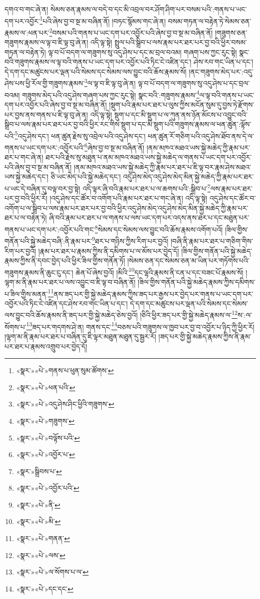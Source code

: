 དགའ་བ་གང་ཞེ་ན། སེམས་ཅན་རྣམས་ལ་བདེ་བ་དང་མི་འབྲལ་བར་ཤོག་ཤིག་པར་བསམ་པའི་:གནས་པ་ཡང་དག་པར་འབྱོར་\footnote{«སྣར་»«པེ་»གནས་པ་ཕུན་སུམ་ཚོགས་}པའི་ཞེས་བྱ་བ་སྔ་མ་བཞིན་ནོ། །བཏང་སྙོམས་གང་ཞེ་ན། བསམ་གཏན་ལ་བརྟེན་ཏེ་སེམས་ཅན་རྣམས་ལ་:ཕན་པར་\footnote{«སྣར་»«པེ་»ཕན་པའི་}བསམ་པའི་གནས་པ་ཡང་དག་པར་འབྱོར་པའི་ཞེས་བྱ་བ་སྔ་མ་བཞིན་ནོ། །གཟུགས་ཅན་གཟུགས་རྣམས་ལ་ལྟ་བ་ཇི་ལྟ་བུ་ཞེ་ན། འདི་ལྟ་སྟེ། སྤྲུལ་པའི་སྒྲིབ་པ་ལས་རྣམ་པར་ཐར་པར་བྱ་བའི་ཕྱིར་བསམ་གཏན་ལ་བརྟེན་ཏེ། ལྟ་བ་པོ་བདག་ལ་གཟུགས་སུ་འདུ་ཤེས་པ་དང་མ་བྲལ་བའམ། གཞག་པས་ཀྱང་རུང་སྟེ། སྣང་བའི་གཟུགས་རྣམས་ལ་ལྟ་བའི་གནས་པ་ཡང་དག་པར་འབྱོར་པའི་ཏིང་ངེ་འཛིན་དང་། ཤེས་རབ་གང་ཡིན་པ་དང་། དེ་དག་དང་མཚུངས་པར་ལྡན་པའི་སེམས་དང་སེམས་ལས་བྱུང་བའི་ཆོས་རྣམས་སོ། །ནང་གཟུགས་མེད་པར་:འདུ་ཤེས་པས་ཕྱི་རོལ་གྱི་གཟུགས་རྣམས་\footnote{«སྣར་»«པེ་»འདུ་ཤེས་ཤིང་ཕྱིའི་གཟུགས་}ལ་ལྟ་བ་ཇི་ལྟ་བུ་ཞེ་ན། ལྟ་བ་པོ་བདག་ལ་གཟུགས་སུ་འདུ་ཤེས་པ་དང་བྲལ་བའམ། གཟུགས་མེད་པའི་འདུ་ཤེས་གཞག་པས་ཀྱང་རུང་སྟེ། སྣང་བའི་:གཟུགས་རྣམས་\footnote{«སྣར་»«པེ་»གཟུགས་}ལ་ལྟ་བའི་གནས་པ་ཡང་དག་པར་འབྱོར་པའི་ཞེས་བྱ་བ་སྔ་མ་བཞིན་ནོ། །སྡུག་པའི་རྣམ་པར་ཐར་པ་ལུས་ཀྱིས་མངོན་སུམ་དུ་བྱས་ཏེ་རྫོགས་པར་བྱས་ནས་གནས་པ་ཇི་ལྟ་བུ་ཞེ་ན། འདི་ལྟ་སྟེ། སྡུག་པ་དང་མི་སྡུག་པ་ལ་ཀུན་ནས་ཉོན་མོངས་པ་འབྱུང་བའི་སྒྲིབ་པ་ལས་རྣམ་པར་ཐར་པར་བྱ་བའི་ཕྱིར་རང་གིས་སྡུག་པ་དང་མི་སྡུག་པའི་གཟུགས་རྣམས་ལ་ཕན་ཚུན་:ལྟོས་པའི་\footnote{«སྣར་»«པེ་»བལྟོས་པའི་}འདུ་ཤེས་དང་། ཕན་ཚུན་རྗེས་སུ་འབྲེལ་པའི་འདུ་ཤེས་དང་། ཕན་ཚུན་རོ་གཅིག་པའི་འདུ་ཤེས་ཐོབ་ནས་དེ་ལ་གནས་པ་ཡང་དག་པར་:འབྱོར་པའི་\footnote{«སྣར་»«པེ་»འབྱོར་པ་}ཞེས་བྱ་བ་སྔ་མ་བཞིན་ནོ། །ནམ་མཁའ་མཐའ་ཡས་སྐྱེ་མཆེད་ཀྱི་རྣམ་པར་ཐར་པ་གང་ཞེ་ན། ཐར་པའི་རྗེས་སུ་མཐུན་པ་ནམ་མཁའ་མཐའ་ཡས་སྐྱེ་མཆེད་ལ་གནས་པ་ཡང་དག་པར་འབྱོར་པའི་ཞེས་བྱ་བ་སྔ་མ་བཞིན་ནོ། །ནམ་མཁའ་མཐའ་ཡས་སྐྱེ་མཆེད་ཀྱི་རྣམ་པར་ཐར་པ་ཇི་ལྟ་བར་རྣམ་ཤེས་མཐའ་ཡས་སྐྱེ་མཆེད་དང་། ཅི་ཡང་མེད་པའི་སྐྱེ་མཆེད་དང་། འདུ་ཤེས་མེད་འདུ་ཤེས་མེད་མིན་སྐྱེ་མཆེད་ཀྱི་རྣམ་པར་ཐར་པ་ཡང་དེ་བཞིན་དུ་བལྟ་བར་བྱ་སྟེ། འདི་ལྟར་ཞི་བའི་རྣམ་པར་ཐར་པ་ལ་ཆགས་པའི་:སྒྲིབ་པ་\footnote{«སྣར་»སྒྲིབས་པ་}ལས་རྣམ་པར་ཐར་པར་བྱ་བའི་ཕྱིར་རོ། །འདུ་ཤེས་དང་ཚོར་བ་འགོག་པའི་རྣམ་པར་ཐར་པ་གང་ཞེ་ན། འདི་ལྟ་སྟེ། འདུ་ཤེས་དང་ཚོར་བ་འགོག་པ་ལ་སྒྲིབ་པ་ལས་རྣམ་པར་ཐར་པར་བྱ་བའི་ཕྱིར་འདུ་ཤེས་མེད་འདུ་ཤེས་མེད་མིན་སྐྱེ་མཆེད་ཀྱི་རྣམ་པར་ཐར་པ་ལ་བརྟེན་ཏེ། ཞི་བའི་རྣམ་པར་ཐར་པ་ལ་གནས་པ་ལས་ཡང་དག་པར་འདས་ནས་ཐར་པ་དང་མཐུན་པར་གནས་པ་ཡང་དག་པར་:འབྱོར་པའི་གང་\footnote{«སྣར་»«པེ་»འབྱོར་པའི་}སེམས་དང་སེམས་ལས་བྱུང་བའི་ཆོས་རྣམས་འགོག་པའོ། །ཟིལ་གྱིས་གནོན་པའི་སྐྱེ་མཆེད་བཞི་:ནི་རྣམ་པར་\footnote{«སྣར་»«པེ་»ནི་}ཐར་པ་གཉིས་ཀྱིས་རིག་པར་བྱའོ། །བཞི་ནི་རྣམ་པར་ཐར་པ་གཅིག་གིས་རིག་པར་བྱའོ། །རྣམ་པར་ཐར་པ་རྣམས་ཀྱིས་ནི་དམིགས་པ་ལ་མོས་པར་བྱེད་དོ། །ཟིལ་གྱིས་གནོན་པའི་སྐྱེ་མཆེད་རྣམས་ཀྱིས་ནི་དབང་བྱེད་པའི་ཕྱིར་ཟིལ་གྱིས་གནོན་ཏོ། །སེམས་ཅན་དང་སེམས་ཅན་མ་ཡིན་པར་གཏོགས་པའི་གཟུགས་རྣམས་ནི་ཆུང་ངུ་དང་། ཆེན་པོ་ཞེས་བྱའོ། །མིའི་\footnote{«སྣར་»«པེ་»མི་}དང་ལྷའི་རྣམས་ནི་ངན་པ་དང་བཟང་པོ་རྣམས་སོ། །ལྷག་མ་ནི་རྣམ་པར་ཐར་པ་ལས་འབྱུང་བ་ཇི་ལྟ་བ་བཞིན་ནོ། །ཟིལ་གྱིས་གནོན་པའི་སྐྱེ་མཆེད་རྣམས་ཀྱིས་དམིགས་པ་ཟིལ་གྱིས་མནན་\footnote{«སྣར་»«པེ་»གནན་}ནས་ཟད་པར་གྱི་སྐྱེ་མཆེད་རྣམས་ཀྱིས་ཟད་པར་རྒྱས་པར་བྱེད་པར་གནས་པ་ཡང་དག་པར་འབྱོར་པའི་ཏིང་ངེ་འཛིན་དང་ཤེས་རབ་གང་ཡིན་པ་དང་། དེ་དག་དང་མཚུངས་པར་ལྡན་པའི་སེམས་དང་སེམས་ལས་བྱུང་བའི་ཆོས་རྣམས་ནི་ཟད་པར་གྱི་སྐྱེ་མཆེད་ཅེས་བྱའོ། །ཅིའི་ཕྱིར་ཟད་པར་གྱི་སྐྱེ་མཆེད་རྣམས་ལ་\footnote{«སྣར་»«པེ་»ལས་}ས་:ལ་སོགས་པ་\footnote{«སྣར་»«པེ་»ལ་སོགས་པ་ལ་}ཟད་པར་གདགས་ཤེ་ན། གནས་དང་\footnote{«སྣར་»«པེ་»དང་དང་}བཅས་པའི་གཟུགས་ལ་ཁྱབ་པར་བྱ་བ་འབྱོར་པ་ཉིད་ཀྱི་ཕྱིར་རོ། །ལྷག་མ་ནི་རྣམ་པར་ཐར་པ་བཞིན་དུ་ཇི་ལྟར་མཐུན་མཐུན་དུ་སྦྱར་རོ། །ཟད་པར་གྱི་སྐྱེ་མཆེད་རྣམས་ཀྱིས་ནི་རྣམ་པར་ཐར་པ་རྣམས་འགྲུབ་པར་བྱེད་དོ། 